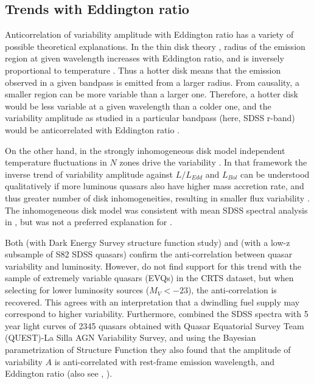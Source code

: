 \documentclass[twocolumn]{aastex62}
\begin{document}
\subsection{Trends with Eddington ratio}
Anticorrelation of  variability amplitude with Eddington ratio  has a variety of possible theoretical explanations. In the thin disk theory \citep{shakura1973, frank2002, netzer2013}, radius of the emission region at given wavelength increases with Eddington ratio, and is inversely proportional to temperature \citep{rakshit2017}. Thus a hotter disk means that the emission observed in a given bandpass is emitted from a larger radius. From causality, a smaller region can be more variable than a larger one. Therefore, a  hotter disk would be less variable at a given wavelength than a colder one, and  the variability amplitude as studied in a particular bandpass (here, SDSS r-band) would be anticorrelated with Eddington ratio \citep{fausnaugh2016,edelson2015}. 

On the other hand, in the strongly inhomogeneous disk model independent temperature fluctuations in $N$ zones drive the variability \citep{dexter2011}. In that framework the inverse trend of variability amplitude against $L/L_{Edd}$  and $L_{Bol}$  can be understood qualitatively if more luminous quasars also have higher mass accretion rate, and thus greater number of disk inhomogeneities, resulting in smaller flux variability \citep{simm2016}. The inhomogeneous disk model was consistent with mean SDSS spectral analysis in \citet{ruan2014}, but was not a preferred explanation for \citet{kokubo2015}. 

Both \citet{rumbaugh2018} (with Dark Energy Survey structure function study) and  \citet{sun2018}  (with a low-z subsample of S82 SDSS quasars) confirm the anti-correlation between quasar variability and luminosity. However, \citet{graham2020} do not find support for this trend with the sample of extremely variable quasars (EVQs) in the CRTS dataset,  but when selecting for lower luminosity sources ($M_{V} < -23$), the anti-correlation is recovered. This agrees with an interpretation that a dwindling fuel supply may correspond to higher variability. Furthermore, \citet{sanchez2018} combined the SDSS spectra with 5 year light curves of 2345 quasars obtained with Quasar Equatorial Survey Team (QUEST)-La Silla AGN Variability Survey, and  using the Bayesian parametrization of Structure Function \citep{schmidt2010} they also found that the amplitude of variability $A$ is anti-correlated with rest-frame emission wavelength,  and Eddington ratio (also see \citealt{simm2016}, \citealt{rakshit2017}).
\end{document}
